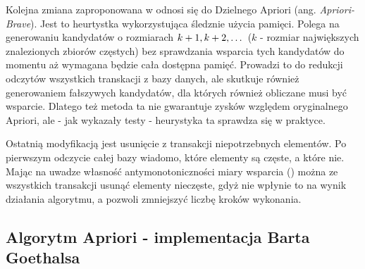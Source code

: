 Kolejna zmiana zaproponowana w \cite{Bodon} odnosi się do Dzielnego Apriori (ang. \textit{Apriori-Brave}). Jest to heurtystka wykorzystująca śledznie użycia pamięci. Polega na generowaniu kandydatów o rozmiarach \(k\nolinebreak+\nolinebreak 1, k\nolinebreak+\nolinebreak 2, \dots\) (\(k\) - rozmiar największych znalezionych zbiorów częstych) bez sprawdzania wsparcia tych kandydatów do momentu aż wymagana będzie cała dostępna pamięć. Prowadzi to do redukcji odczytów wszystkich transkacji z bazy danych, ale skutkuje również generowaniem fałszywych kandydatów, dla których również obliczane musi być wsparcie. Dlatego też metoda ta nie gwarantuje zysków względem oryginalnego Apriori, ale - jak wykazały testy - heurystyka ta sprawdza się w praktyce.

Ostatnią modyfikacją jest usunięcie z transakcji niepotrzebnych elementów. Po pierwszym odczycie całej bazy wiadomo, które elementy są częste, a które nie. Mając na uwadze własność antymonotoniczności miary wsparcia (\cite{Morzy}) można ze wszystkich transakcji usunąć elementy nieczęste, gdyż nie wpłynie to na wynik działania algorytmu, a pozwoli zmniejszyć liczbę kroków wykonania. 

\subsection{Algorytm Apriori - implementacja Barta Goethalsa \cite{Goethals}}
\label{c324}


